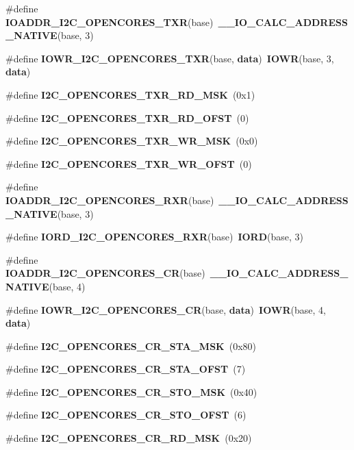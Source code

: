 \begin{DoxyCompactItemize}
\item 
\#define {\bf I\+O\+A\+D\+D\+R\+\_\+\+I2\+C\+\_\+\+O\+P\+E\+N\+C\+O\+R\+E\+S\+\_\+\+T\+XR}(base)~{\bf \+\_\+\+\_\+\+I\+O\+\_\+\+C\+A\+L\+C\+\_\+\+A\+D\+D\+R\+E\+S\+S\+\_\+\+N\+A\+T\+I\+VE}(base, 3)
\item 
\#define {\bf I\+O\+W\+R\+\_\+\+I2\+C\+\_\+\+O\+P\+E\+N\+C\+O\+R\+E\+S\+\_\+\+T\+XR}(base,  {\bf data})~{\bf I\+O\+WR}(base, 3, {\bf data})
\item 
\#define {\bf I2\+C\+\_\+\+O\+P\+E\+N\+C\+O\+R\+E\+S\+\_\+\+T\+X\+R\+\_\+\+R\+D\+\_\+\+M\+SK}~(0x1)
\item 
\#define {\bf I2\+C\+\_\+\+O\+P\+E\+N\+C\+O\+R\+E\+S\+\_\+\+T\+X\+R\+\_\+\+R\+D\+\_\+\+O\+F\+ST}~(0)
\item 
\#define {\bf I2\+C\+\_\+\+O\+P\+E\+N\+C\+O\+R\+E\+S\+\_\+\+T\+X\+R\+\_\+\+W\+R\+\_\+\+M\+SK}~(0x0)
\item 
\#define {\bf I2\+C\+\_\+\+O\+P\+E\+N\+C\+O\+R\+E\+S\+\_\+\+T\+X\+R\+\_\+\+W\+R\+\_\+\+O\+F\+ST}~(0)
\item 
\#define {\bf I\+O\+A\+D\+D\+R\+\_\+\+I2\+C\+\_\+\+O\+P\+E\+N\+C\+O\+R\+E\+S\+\_\+\+R\+XR}(base)~{\bf \+\_\+\+\_\+\+I\+O\+\_\+\+C\+A\+L\+C\+\_\+\+A\+D\+D\+R\+E\+S\+S\+\_\+\+N\+A\+T\+I\+VE}(base, 3)
\item 
\#define {\bf I\+O\+R\+D\+\_\+\+I2\+C\+\_\+\+O\+P\+E\+N\+C\+O\+R\+E\+S\+\_\+\+R\+XR}(base)~{\bf I\+O\+RD}(base, 3)
\item 
\#define {\bf I\+O\+A\+D\+D\+R\+\_\+\+I2\+C\+\_\+\+O\+P\+E\+N\+C\+O\+R\+E\+S\+\_\+\+CR}(base)~{\bf \+\_\+\+\_\+\+I\+O\+\_\+\+C\+A\+L\+C\+\_\+\+A\+D\+D\+R\+E\+S\+S\+\_\+\+N\+A\+T\+I\+VE}(base, 4)
\item 
\#define {\bf I\+O\+W\+R\+\_\+\+I2\+C\+\_\+\+O\+P\+E\+N\+C\+O\+R\+E\+S\+\_\+\+CR}(base,  {\bf data})~{\bf I\+O\+WR}(base, 4, {\bf data})
\item 
\#define {\bf I2\+C\+\_\+\+O\+P\+E\+N\+C\+O\+R\+E\+S\+\_\+\+C\+R\+\_\+\+S\+T\+A\+\_\+\+M\+SK}~(0x80)
\item 
\#define {\bf I2\+C\+\_\+\+O\+P\+E\+N\+C\+O\+R\+E\+S\+\_\+\+C\+R\+\_\+\+S\+T\+A\+\_\+\+O\+F\+ST}~(7)
\item 
\#define {\bf I2\+C\+\_\+\+O\+P\+E\+N\+C\+O\+R\+E\+S\+\_\+\+C\+R\+\_\+\+S\+T\+O\+\_\+\+M\+SK}~(0x40)
\item 
\#define {\bf I2\+C\+\_\+\+O\+P\+E\+N\+C\+O\+R\+E\+S\+\_\+\+C\+R\+\_\+\+S\+T\+O\+\_\+\+O\+F\+ST}~(6)
\item 
\#define {\bf I2\+C\+\_\+\+O\+P\+E\+N\+C\+O\+R\+E\+S\+\_\+\+C\+R\+\_\+\+R\+D\+\_\+\+M\+SK}~(0x20)
\item 

\end{DoxyCompactItemize}
